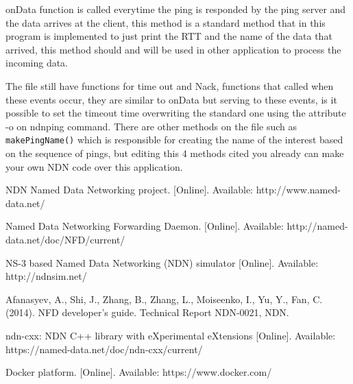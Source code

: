 \documentclass[10pt,letterpaper,extrafontsizes]{memoir}
\begin{document}
\clearpage
onData function is called everytime the ping is responded by the ping server and the data arrives at the client, this method is a standard method that in this program is implemented to just print the RTT and the name of the data that arrived, this method should and will be used in other application to process the incoming data. \par
The file still have functions for time out and Nack, functions that called when these events occur, they are similar to onData but serving to these events, is it possible to set the timeout time overwriting the standard one using the attribute -o on ndnping command. There are other methods on the file such as \texttt{makePingName()} which is responsible for creating the name of the interest based on the sequence of pings, but editing this 4 methods cited you already can make your own NDN code over this application.






\begin{thebibliography}{99}

NDN Named Data Networking project. [Online]. Available:
http://www.named-data.net/


Named Data Networking Forwarding Daemon. [Online]. Available:
http://named-data.net/doc/NFD/current/


NS-3 based Named Data Networking (NDN) simulator 
[Online]. Available:
http://ndnsim.net/

Afanasyev, A., Shi, J., Zhang, B., Zhang, L., Moiseenko, I., Yu, Y., Fan, C. (2014). NFD developer’s guide. Technical Report NDN-0021, NDN.


ndn-cxx: NDN C++ library with eXperimental eXtensions [Online]. Available:
https://named-data.net/doc/ndn-cxx/current/


Docker platform.
[Online]. Available:
https://www.docker.com/

\end{thebibliography}
  
\end{document}
